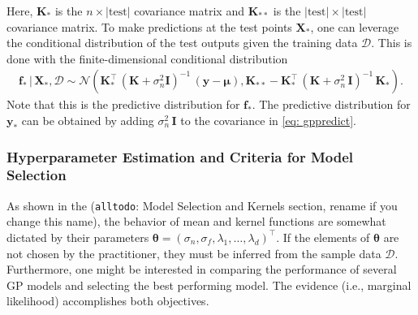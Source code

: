 \documentclass[journal=jacsat,manuscript=article]{achemso}
\newcommand{\alltodo}[1]{{\color{Cyan} (\texttt{alltodo}: #1)}}
\newcommand{\xmatrix}{\ensuremath{\mathbf{X}}}
\begin{document}
 Here, $\mathbf{K}_*$ is the $n \times |\text{test}|$ covariance matrix and $\mathbf{K}_{**}$ is the $|\text{test}| \times |\text{test}|$ covariance matrix. 
 To make predictions at the test points $\xmatrix_{*}$, one can leverage the conditional distribution of the test outputs given the training data $\mathcal{D}$. This is done with the finite-dimensional conditional distribution
 \begin{gather}
     \mathbf{f}_* \,|\, \xmatrix_*, \mathcal{D} \sim \mathcal{N}(\mathbf{K}_{*}^\intercal \,(\mathbf{K} +\sigma_n^2 \mathbf{I})^{-1}\,(\mathbf{y}-\boldsymbol{\mu}),  \mathbf{K}_{**} - \mathbf{K}_{*}^\intercal \,(\mathbf{K}+\sigma_n^2\,\mathbf{I})^{-1}\,\mathbf{K}_{*}).   \label{eq: gppredict}
 \end{gather}
 Note that this is the predictive distribution for $\mathbf{f}_*$. The predictive distribution for $\mathbf{y}_*$ can be obtained by adding $\sigma_n^2\, \mathbf{I}$ to the covariance in \eqref{eq: gppredict}.

 \subsubsection{Hyperparameter Estimation and Criteria for Model Selection}
 As shown in the \alltodo{Model Selection and Kernels section, rename if you change this name}, the behavior of mean and kernel functions are somewhat dictated by their parameters $\boldsymbol{\theta} = (\sigma_n, \sigma_f, \lambda_1,\dots,\lambda_d)^\intercal$. If the elements of $\boldsymbol{\theta}$ are not chosen by the practitioner, they must be inferred from the sample data $\mathcal{D}$. Furthermore, one might be interested in comparing the performance of several GP models and selecting the best performing model. The evidence (i.e., marginal likelihood) accomplishes both objectives.
\end{document}
